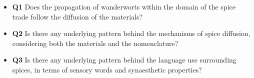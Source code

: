 \begin{itemize}
    \item \textbf{Q1} Does the propagation of \glspl{wanderwort} within the domain of the spice trade follow the diffusion of the materials?

    \item \textbf{Q2} Is there any underlying pattern behind the mechanisms of spice diffusion, considering both the materials and the nomenclature?
    
    \item \textbf{Q3} Is there any underlying pattern behind the language use surrounding spices, in terms of sensory words and synaesthetic properties?
    
    

\end{itemize}





